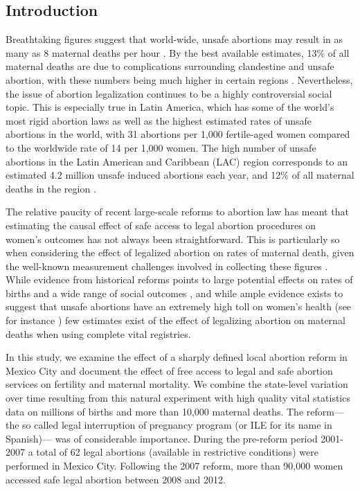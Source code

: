 \documentclass[a4paper, 11pt]{article}
\begin{document}
\begin{spacing}{2}
\section{Introduction}
Breathtaking figures suggest that world-wide, unsafe abortions may result in as many as 8 maternal deaths per hour \citep{TheLancet2009}.  By the best available estimates, 13\% of all maternal deaths are due to complications surrounding clandestine and unsafe abortion, with these numbers being much higher in certain regions \citep{WHO2011}.  Nevertheless, the issue of abortion legalization continues to be a highly controversial social topic.  This is especially true in Latin America, which has some of the world's most rigid abortion laws \citep{UN2014} as well as the highest estimated rates of unsafe abortions in the world, with 31 abortions per 1,000 fertile-aged women compared to the worldwide rate of 14 per 1,000 women. The high number of unsafe abortions in the Latin American and Caribbean (LAC) region corresponds to an estimated 4.2 million unsafe induced abortions each year, and 12\% of all maternal deaths in the region \citep{WHO2011}.

The relative paucity of recent large-scale reforms to abortion law has meant that estimating the causal effect of safe access to legal abortion procedures on women's outcomes has not always been straightforward.  This is particularly so when considering the effect of legalized abortion on rates of maternal death, given the well-known measurement challenges involved in collecting these figures \citep{hogan2010maternal}.  While evidence from historical reforms points to large potential effects on rates of births and a wide range of social outcomes \citep{ananat_abortion_2009,AngristEvans,DonohueLevitt2001,CharlesStephens2002,Baileyetal2013,Pop-Eleches}, and while ample evidence exists to suggest that unsafe abortions have an extremely high toll on women's health (see for instance \cite{Grimes2006}) few estimates exist of the effect of legalizing abortion on maternal deaths when using complete vital registries.

In this study, we examine the effect of a sharply defined local abortion reform in Mexico City and document the effect of free access to legal and safe abortion services on fertility and maternal mortality.  We combine the state-level variation over time resulting from this natural experiment with high quality vital statistics data on millions of births and more than 10,000 maternal deaths.  The reform---the so called legal interruption of pregnancy program (or ILE for its name in Spanish)--- was of considerable importance.  During the pre-reform period 2001-2007 a total of 62 legal abortions (available in restrictive conditions) were performed in Mexico City.  Following the 2007 reform, more than 90,000 women accessed safe legal abortion between 2008 and 2012.


\end{spacing}
\end{document}
